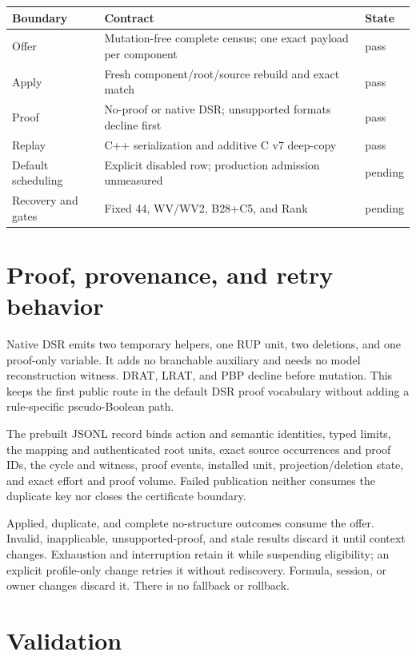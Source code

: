 \documentclass[11pt]{article}
\newcommand{\pending}{\textcolor{orange!70!black}{pending}}
\newcommand{\pass}{\textcolor{green!45!black}{pass}}
\begin{document}
\begin{center}
\begin{tabularx}{\textwidth}{@{}lXl@{}}
\toprule
Boundary & Contract & State \\
\midrule
Offer & Mutation-free complete census; one exact payload per component & \pass \\
Apply & Fresh component/root/source rebuild and exact match & \pass \\
Proof & No-proof or native DSR; unsupported formats decline first & \pass \\
Replay & C++ serialization and additive C v7 deep-copy & \pass \\
Default scheduling & Explicit disabled row; production admission unmeasured & \pending \\
Recovery and gates & Fixed 44, WV/WV2, B28+C5, and Rank & \pending \\
\bottomrule
\end{tabularx}
\end{center}

\section*{Proof, provenance, and retry behavior}

Native DSR emits two temporary helpers, one RUP unit, two deletions, and one
proof-only variable. It adds no branchable auxiliary and needs no model
reconstruction witness. DRAT, LRAT, and PBP decline before mutation. This keeps
the first public route in the default DSR proof vocabulary without adding a
rule-specific pseudo-Boolean path.

The prebuilt JSONL record binds action and semantic identities, typed limits,
the mapping and authenticated root units, exact source occurrences and proof
IDs, the cycle and witness, proof events, installed unit, projection/deletion
state, and exact effort and proof volume. Failed publication neither consumes
the duplicate key nor closes the certificate boundary.

Applied, duplicate, and complete no-structure outcomes consume the offer.
Invalid, inapplicable, unsupported-proof, and stale results discard it until
context changes. Exhaustion and interruption retain it while suspending
eligibility; an explicit profile-only change retries it without rediscovery.
Formula, session, or owner changes discard it. There is no fallback or rollback.

\section*{Validation}
\end{document}
